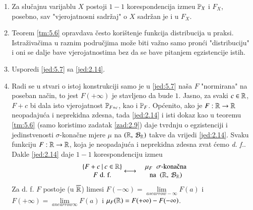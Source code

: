 \begin{nap} \label{nap:5.8}
    \begin{enumerate}[label=(\alph*)]
        \item   \label{nap:5.8a}
        Za slu\v cajnu varijablu $X$ postoji $1-1$ korespondencija izme\dj u $\mathbb{P}_X$ i $F_X$, posebno, sav "vjerojatnosni sadr\v zaj" o $X$ sadr\v zan je i u $F_X$.
        \item Teorem \ref{tm:5.6} opravdava \v cesto kori\v stenje funkcija distribucija u praksi.
        Istra\v ziva\v cima u raznim podru\v cjima mo\v ze biti va\v zno samo pron\' ci "distribuciju" i oni se dalje bave vjerojatnostima bez da se bave pitanjem egzistencije istih.
        \item Usporedi \eqref{jed:5.7} sa \eqref{jed:2.14}.
        \item Radi se u stvari o istoj konstrukciji samo je u \eqref{jed:5.7} na\v sa $F$ "normirana" na poseban na\v cin, to jest $F(+\infty)$ je stavljeno da bude $1$.
        Jasno, za svaki $c \in \mathbb{R}$, $F + c$ bi dala isto vjerojatnost $\mathbb{P}_{F + c}$, kao i $\mathbb{P}_F$.
        Op\' cenito, ako je $F: \mathbb{R} \to \mathbb{R}$ neopadaju\' ca i neprekidna zdesna, tada \eqref{jed:2.14} i isti dokaz kao u teoremu \ref{tm:5.6} (samo koristimo zadatak \ref{zad:2.9}) daje tvrdnju o egzistenciji i jedinstvenosti $\sigma$-kona\v cne mjere $\mu$ na $({\mathbb{R}}, \: {\mathcal{B}_{\mathbb{R}}})$ takve da vrijedi \eqref{jed:2.14}. Svaku funkciju $F : \mathbb{R} \to \mathbb{R}$, koja je neopadaju\' ca i neprekidna zdesna zvat \' cemo \emph{d. f.}.
        Dakle \eqref{jed:2.14} daje $1-1$ korespondenciju izme\dj u
        \begin{equation}    \label{jed:5.9}
            \begin{matrix}
                &\skup{F + c}{c \in \real}\\
                &F \; \textnormal{d. f.}
            \end{matrix}
            \longleftrightarrow
            \begin{matrix}
                &\mu_F \;\; \sigma \textnormal{-kona\v cna}\\
                &\textnormal{na } \; \urePar{\real}{\borel{\real}}
            \end{matrix}
        \end{equation}
        Za d. f. $F$ postoje (u $\overline{\mathbb{R}}$) limesi $F(-\infty) = \lim\limits_{a searrow -\infty} F(a)$ i $F(+\infty) = \lim\limits_{a nearrow \infty} F(a)$ i $\mu_F(\mathbb{R}) = F(+\infty) - F(-\infty)$.
    \end{enumerate}
\end{nap}

